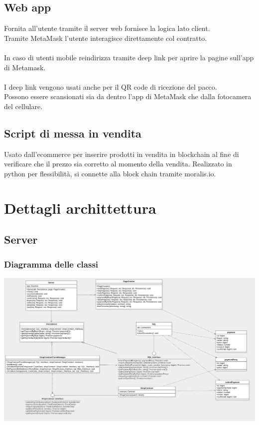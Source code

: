 \documentclass[a4paper, 12pt]{article}
\begin{document}
\subsection{Web app}
Fornita all'utente tramite il server web fornisce la logica lato client.\\
Tramite MetaMask l'utente interagisce direttamente col contratto.\\\\
In caso di utenti mobile reindirizza tramite deep link per aprire la pagine sull'app di Metamask.\\\\
I deep link vengono usati anche per il QR code di ricezione del pacco.\\
Possono essere scansionati sia da dentro l'app di MetaMask che dalla fotocamera del cellulare.

\subsection{Script di messa in vendita}
Usato dall'ecommerce per inserire prodotti in vendita in blockchain al fine di verificare che il prezzo sia corretto al momento della vendita.
Realizzato in python per flessibilità, si connette alla block chain tramite moralis.io.

\section{Dettagli archittettura}
\subsection{Server}
\subsubsection{Diagramma delle classi}
\includegraphics[width=1.0\textwidth]{server_class}
\end{document}
